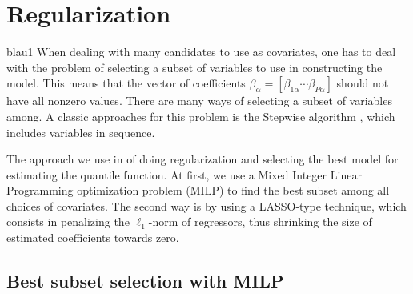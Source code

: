 \section{Regularization}
blau1
When dealing with many candidates to use as covariates, one has to deal with the problem of selecting a subset of variables to use in constructing the model. 
This means that the vector of coefficients $\beta_\alpha = [ \beta_{1 \alpha} \cdots \beta_{P\alpha} ]$ should not have all nonzero values.
There are many ways of selecting a subset of variables among.
A classic approaches for this problem is the Stepwise algorithm \cite{efroymson1960multiple}, which includes variables in sequence. 

The approach we use in  of doing regularization and selecting the best model for estimating the quantile function. At first, we use a Mixed Integer Linear Programming optimization problem (MILP) to find the best subset among all choices of covariates. The second way is by using a LASSO-type technique, which consists in penalizing the $\ell_1$-norm of regressors, thus shrinking the size of estimated coefficients towards zero.  

\subsection{Best subset selection with MILP}
\label{sec:best-subset-mip}

